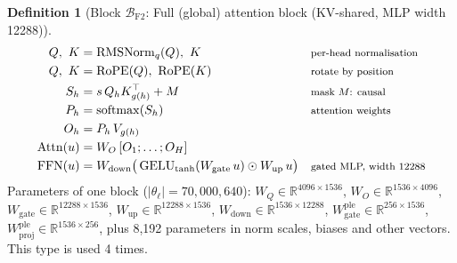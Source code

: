 \documentclass[10pt,a4paper]{article}
\newcommand{\op}[1]{\operatorname{#1}}
\theoremstyle{definition}
\newtheorem{definition}{Definition}[section]
\begin{document}
\begin{definition}[Block $\mathcal{B}_{\mathrm{F2}}$: Full (global) attention block (KV-shared, MLP width 12288)]
\begin{align*}
  Q,\ K &= \op{RMSNorm}_q(Q),\ K && \text{\footnotesize per-head normalisation} \\
  Q,\ K &= \op{RoPE}(Q),\ \op{RoPE}(K) && \text{\footnotesize rotate by position} \\
  S_h &= s\, Q_h K_{g(h)}^{\top} + M && \text{\footnotesize mask $M$: causal} \\
  P_h &= \op{softmax}(S_h) && \text{\footnotesize attention weights} \\
  O_h &= P_h\, V_{g(h)} \\
  \op{Attn}(u) &= W_O\,[O_1;\dots;O_H] \\
  \op{FFN}(u) &= W_{\mathrm{down}}\big(\op{GELU}_{\tanh}(W_{\mathrm{gate}}\,u)\odot W_{\mathrm{up}}\,u\big) && \text{\footnotesize gated MLP, width 12288}
\end{align*}
Parameters of one block ($|\theta_\ell|=70{,}000{,}640$): $W_Q\in\mathbb{R}^{4096\times1536}$, $W_O\in\mathbb{R}^{1536\times4096}$, $W_{\mathrm{gate}}\in\mathbb{R}^{12288\times1536}$, $W_{\mathrm{up}}\in\mathbb{R}^{12288\times1536}$, $W_{\mathrm{down}}\in\mathbb{R}^{1536\times12288}$, $W^{\mathrm{ple}}_{\mathrm{gate}}\in\mathbb{R}^{256\times1536}$, $W^{\mathrm{ple}}_{\mathrm{proj}}\in\mathbb{R}^{1536\times256}$, plus 8,192 parameters in norm scales, biases and other vectors. This type is used 4 times.
\end{definition}
\end{document}

